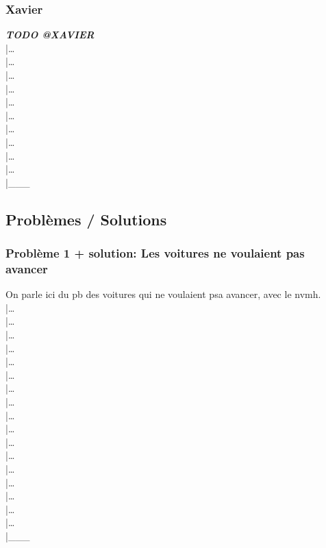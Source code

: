 \documentclass[12pt,a4paper]{article}
\begin{document}
            \subsubsection{Xavier}
                \textit{\bfseries TODO @XAVIER}\\
                |\dots\\|\dots\\|\dots\\|\dots\\|\dots\\|\dots\\|\dots\\|\dots\\|\dots\\|\dots\\|\_\_\_\\


        \clearpage
        \subsection{Problèmes / Solutions}

            \subsubsection{Problème 1 + solution: Les voitures ne voulaient pas avancer}
                On parle ici du pb des voitures qui ne voulaient psa avancer, avec le nvmh.\\
                |\dots\\|\dots\\|\dots\\|\dots\\|\dots\\|\dots\\|\dots\\|\dots\\|\dots\\
                |\dots\\|\dots\\|\dots\\|\dots\\|\dots\\|\dots\\|\dots\\|\dots\\|\_\_\_\\
\end{document}
